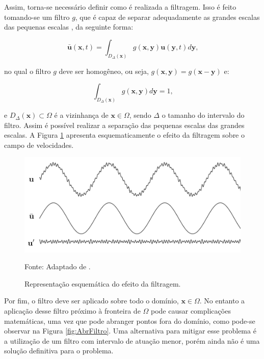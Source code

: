 \documentclass[_ArquivoPrincipal.tex]{subfiles}
\begin{document}
Assim, torna-se necessário definir como é realizada a filtragem. Isso é feito tomando-se um filtro $g$, que é capaz de separar adequadamente as grandes escalas das pequenas escalas \cite{hughes2000large}, da seguinte forma:

\begin{equation}
    \bar{\mathbf{u}}(\mathbf{x},t)=\int_{D_\Delta(\mathbf{x})}{g(\mathbf{x},\mathbf{y})\mathbf{u}(\mathbf{y},t)d\mathbf{y}}\text{,}
    \label{Filtro1}
\end{equation}

\noindent no qual o filtro $g$ deve ser homogêneo, ou seja, $g(\mathbf{x},\mathbf{y})=g(\mathbf{x}-\mathbf{y})$ e:

\begin{equation}
    \int_{D_\Delta(\mathbf{x})}{g(\mathbf{x},\mathbf{y})d\mathbf{y}}=1\text{,}
    \label{Filtro2}
\end{equation}

\noindent e $D_\Delta(\mathbf{x})\subset\Omega$ é a vizinhança de $\mathbf{x}\in\Omega$, sendo $\Delta$ o tamanho do intervalo do filtro. Assim é possível realizar a separação das pequenas escalas das grandes escalas. A Figura \ref{fig:Filtragem} apresenta esquematicamente o efeito da filtragem sobre o campo de velocidades.

\begin{figure}[h]
    \centering
    \includegraphics[width=0.65\linewidth]{Figuras/Filtragem.png}
    \caption{Representação esquemática do efeito da filtragem.}
    Fonte: Adaptado de .
    \label{fig:Filtragem}
\end{figure}

Por fim, o filtro deve ser aplicado sobre todo o domínio, $\mathbf{x}\in\Omega$. No entanto a aplicação desse filtro próximo à fronteira de $\Omega$ pode causar complicações matemáticas, uma vez que pode abranger pontos fora do domínio, como pode-se observar na Figura \ref{fig:AbrFiltro}. Uma alternativa para mitigar esse problema é a utilização de um filtro com intervalo de atuação menor, porém ainda não é uma solução definitiva para o problema.
\end{document}
